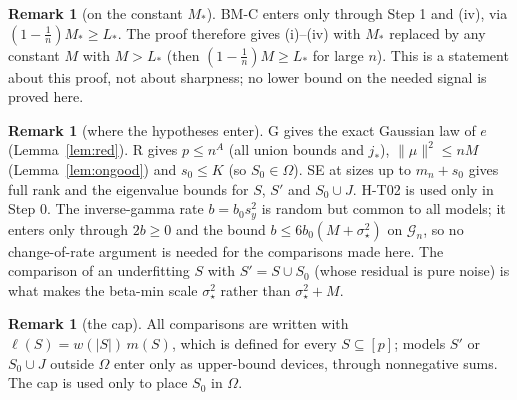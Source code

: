 \documentclass[11pt]{article}
\theoremstyle{definition}
\newtheorem{remark}[theorem]{Remark}
\newcommand{\1}{\mathbf 1}
\newcommand{\Gn}{\mathcal G_n}
\newcommand{\sst}{\sigma_\star^2}
\begin{document}
\begin{remark}[on the constant $M_*$]
BM-C enters only through Step 1 and (iv), via $(1-\frac1n)M_*\ge L_*$. The proof therefore gives (i)--(iv) with $M_*$ replaced by any constant $M$ with $M>L_*$ (then $(1-\frac1n)M\ge L_*$ for large $n$). This is a statement about this proof, not about sharpness; no lower bound on the needed signal is proved here.
\end{remark}

\begin{remark}[where the hypotheses enter]
G gives the exact Gaussian law of $e$ (Lemma~\ref{lem:red}). R gives $p\le n^A$ (all union bounds and $j_*$), $\|\mu\|^2\le nM$ (Lemma~\ref{lem:ongood}) and $s_0\le K$ (so $S_0\in\Omega$). SE at sizes up to $m_n+s_0$ gives full rank and the eigenvalue bounds for $S$, $S'$ and $S_0\cup J$. H-T02 is used only in Step 0. The inverse-gamma rate $b=b_0s_y^2$ is random but common to all models; it enters only through $2b\ge0$ and the bound $b\le6b_0(M+\sst)$ on $\Gn$, so no change-of-rate argument is needed for the comparisons made here. The comparison of an underfitting $S$ with $S'=S\cup S_0$ (whose residual is pure noise) is what makes the beta-min scale $\sst$ rather than $\sst+M$.
\end{remark}

\begin{remark}[the cap]
All comparisons are written with $\ell(S)=w(|S|)\,m(S)$, which is defined for every $S\subseteq[p]$; models $S'$ or $S_0\cup J$ outside $\Omega$ enter only as upper-bound devices, through nonnegative sums. The cap is used only to place $S_0$ in $\Omega$.
\end{remark}
\end{document}
